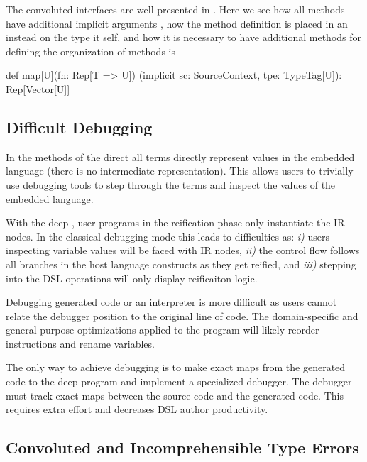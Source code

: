  The convoluted interfaces are well presented in . Here we see
  how all methods have additional implicit arguments , how the method
  definition is placed in an  instead on the type it self, and how
  it is necessary to have additional methods for defining the
  organization of methods is \begin{lstparagraph}
  def map[U](fn: Rep[T => U])
    (implicit sc: SourceContext, tpe: TypeTag[U]): Rep[Vector[U]]
 \end{lstparagraph}

\subsection{Difficult Debugging}
\label{sec:difficult-debugging}

In the methods of the direct \edsl{} all terms
 directly represent values in the embedded language (there is no intermediate
 representation). This allows users to trivially use debugging tools to step
 through the terms and inspect the values of the embedded language.

With the deep \edsl{}, user programs in the reification phase only instantiate the IR nodes. In the classical
 debugging mode this leads to difficulties as: \emph{i)} users inspecting variable values
 will be faced with IR nodes, \emph{ii)} the control flow follows all branches in
 the host language constructs as they get reified, and \emph{iii)} stepping into the
 DSL operations will only display reificaiton logic.

Debugging generated code or an interpreter is more difficult as users cannot relate
 the debugger position to the original line of code. The domain-specific and general
 purpose optimizations applied to the program will likely reorder instructions and
 rename variables.

The only way to achieve debugging is to make exact maps from the generated code to
 the deep program and implement a specialized debugger. The debugger must track
 exact maps between the source code and the generated code. This requires extra effort
 and decreases DSL author productivity.


\subsection{Convoluted and Incomprehensible Type Errors}
\label{sec:incomprehensible-type-errors}

